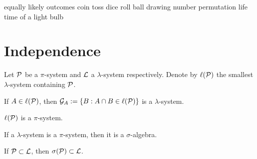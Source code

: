 \documentclass{../../large}
\begin{document}
equally likely outcomes
	coin toss
	dice roll
	ball drawing
	number permutation
	life time of a light bulb






\chapter{Independence}


\begin{prb}
Let $\mathcal{P}$ be a $\pi$-system and $\mathcal{L}$ a $\lambda$-system respectively.
Denote by $\ell(\mathcal{P})$ the smallest $\lambda$-system containing $\mathcal{P}$.
\begin{parts}
\item If $A\in\ell(\mathcal{P})$, then $\mathcal{G}_A:=\{B:A\cap B\in\ell(\mathcal{P})\}$ is a $\lambda$-system.
\item $\ell(\mathcal{P})$ is a $\pi$-system.
\item If a $\lambda$-system is a $\pi$-system, then it is a $\sigma$-algebra.
\item If $\mathcal{P}\subset\mathcal{L}$, then $\sigma(\mathcal{P})\subset\mathcal{L}$.
\end{parts}
\end{prb}

\begin{prb}

\end{prb}
\end{document}
